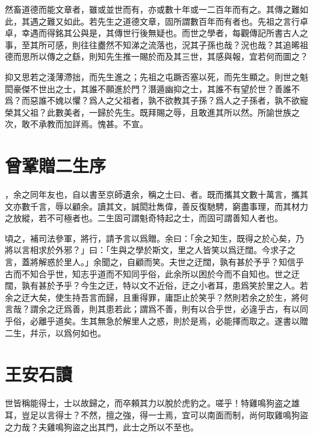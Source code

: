 然畜道德而能文章者，雖或並世而有，亦或數十年或一二百年而有之。其傳之難如此，其遇之難又如此。若先生之道德文章，固所謂數百年而有者也。先祖之言行卓卓，幸遇而得銘其公與是，其傳世行後無疑也。而世之學者，每觀傳記所書古人之事，至{其}所可感，則往往衋然不知涕之流落也，況其子孫也哉？況也哉？其追晞祖德而思所以傳之之{繇}，則知先生推一賜於而及其三世，其感與報，宜若何而圖之？%

抑又思若之淺薄滯拙，而先生進之；先祖之屯蹶否塞以死，而先生顯之。則世之魁閎豪傑不世出之士，其誰不願進於門？潛遁幽抑之士，其誰不有望於世？善誰不爲？而惡誰不媿以懼？爲人之父祖者，孰不欲教其子孫？爲人之子孫者，孰不欲寵榮其父祖？此數美者，一歸於先生。既拜賜之辱，且敢進其所以然。所諭世族之次，敢不承教而加詳焉。愧甚。不宣。

\theendnotes

\section[贈黎安二生序\quad{\small 曾鞏}]{{\normalsize 曾鞏}\quad 贈二生序}
，余之同年友也，自以書至京師遺余，稱之士曰、者。既而攜其文數十萬言，攜其文亦數千言，辱以顧余。讀其文，誠閎壯雋偉，善反{復}馳騁，窮盡事理，而其材力之放縱，若不可極者也。二生固可謂魁奇特起之士，而固可謂善知人者也。%

頃之，補司法參軍，將行，請予言以爲贈。余曰：「余之知生，既得之於心矣，乃將以言相求於外邪？」曰：「生與之學於斯文，里之人皆笑以爲迂闊。今求子之言，蓋將解惑於里人。」余聞之，自顧而笑。夫世之迂闊，孰有甚於予乎？知信乎古而不知合乎世，知志乎道而不知同乎俗，此余所以困於今而不自知也。世之迂闊，孰有甚於予乎？今生之迂，特以文不近俗，迂之小者耳，患爲笑於里之人。若余之迂大矣，使生持吾言而歸，且重得罪，庸詎止於笑乎？然則若余之於生，將何言哉？謂余之迂爲善，則其患若此；謂爲不善，則有以合乎世，必違乎古，有以同乎俗，必離乎道矣。生其無急於解里人之惑，則於是焉，必能擇而取之。遂書以贈二生，幷示，以爲何如也。

\section[讀孟嘗君傳\quad{\small 王安石}]{{\normalsize 王安石}\quad 讀}
世皆稱能得士，士以故歸之，而卒頼其力以脫於虎豹之。嗟乎！特雞鳴狗盗之雄耳，豈足以言得士？不然，擅之強，得一士焉，宜可以南面而制，尚何取雞鳴狗盜之力哉？{夫}雞鳴狗盜之出其門，此士之所以不至也。%

